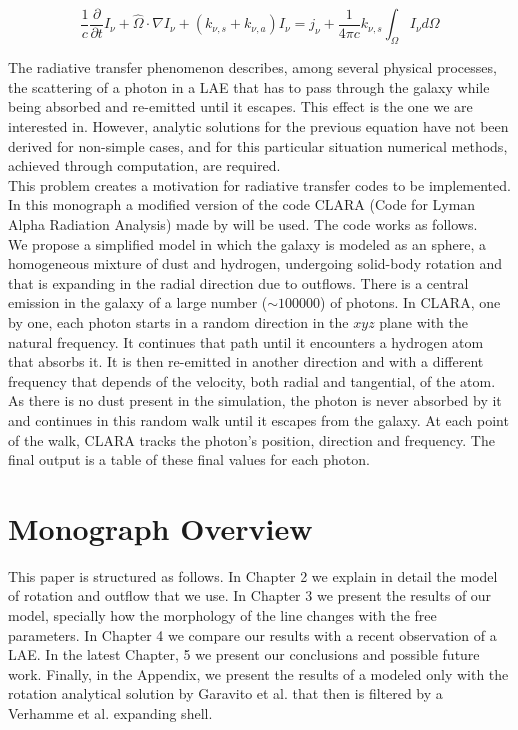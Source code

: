\begin{equation}
\label{eq:radiative}
\frac{1}{c}\frac{\partial}{\partial t}I_{\nu} + \hat{\Omega}\cdot\nabla I_{\nu} + (k_{\nu,s} + k_{\nu,a})I_{\nu} = j_{\nu} + \frac{1}{4\pi c}k_{\nu,s}\int_{\Omega}I_{\nu}d\Omega
\end{equation}

The radiative transfer phenomenon describes, among several physical processes, the scattering of a photon in a LAE that has to pass through the galaxy while being absorbed and re-emitted until it escapes. This effect is the one we are interested in. However, analytic solutions for the previous equation have not been derived for non-simple cases, and for this particular situation numerical methods, achieved through computation, are required. \\

This problem creates a motivation for radiative transfer codes to be implemented. In this monograph a modified version of the code CLARA (Code for Lyman Alpha Radiation Analysis) made by \cite{CLARA} will be used. The code works as follows.\\

We propose a simplified model in which the galaxy is modeled as an sphere, a homogeneous mixture of dust and hydrogen, undergoing solid-body rotation and that is expanding in the radial direction due to outflows. There is a central emission in the galaxy of a large number ($\sim 100000$) of photons. In CLARA, one by one, each photon starts in a random direction in the $xyz$ plane with the natural \lya frequency. It continues that path until it encounters a hydrogen atom that absorbs it. It is then re-emitted in another direction and with a different frequency that depends of the velocity, both radial and tangential, of the atom. As there is no dust present in the simulation, the photon is never absorbed by it and continues in this random walk until it escapes from the galaxy. At each point of the walk, CLARA tracks the photon's position, direction and frequency. The final output is a table of these final values for each photon. \\



\section{Monograph Overview}
This paper is structured as follows. In Chapter 2 we explain in detail the model of rotation and outflow that we use. In Chapter 3 we present the results of our model, specially how the morphology of the line changes with the free parameters. In Chapter 4 we compare our results with a recent observation of a LAE. In the latest Chapter, 5 we present our conclusions and possible future work. Finally, in the Appendix, we present the results of a \lya modeled only with the rotation analytical solution by Garavito et al. \cite{Garavito14} that then is filtered by a Verhamme et al. \cite{Verhamme06} expanding shell.\\